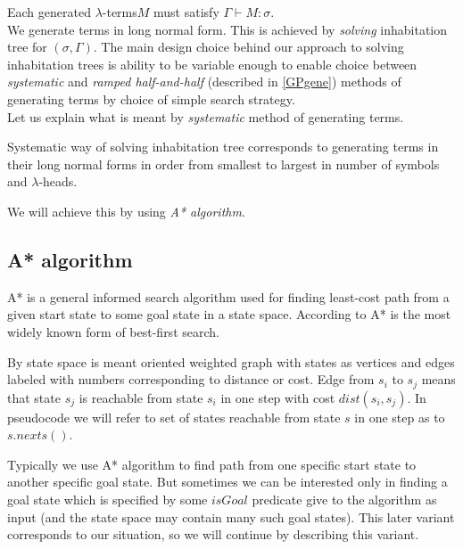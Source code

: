 \documentclass[12pt,a4paper]{report}
\newcommand{\Lets}{Let us\xspace}
\newcommand{\lterms}{$\lambda$-terms\xspace}
\newcommand{\lheads}{$\lambda$-heads\xspace}
\newcommand{\turst}[3]{$#1\vdash{}#2:#3$\xspace}
\newcommand{\GMS}{\turst{\Gamma}{M}{\sigma}}
\begin{document}
Each generated \lterms $M$ must  satisfy \GMS. \\

We generate terms in long normal form.
This is achieved by \textit{solving} inhabitation tree for $(\sigma,\Gamma)$.  
The main design choice behind our approach to solving inhabitation trees
is ability to be variable enough to enable choice between 
\textit{systematic}  
and \textit{ramped half-and-half} (described in \ref{GPgene}) 
methods of generating terms 
by choice of simple search strategy.\\

\Lets explain what is meant by \textit{systematic} 
method of generating terms. 

Systematic way of solving inhabitation tree corresponds to
generating terms in their long normal forms
in order from smallest to largest in number of symbols and \lheads.

We will achieve this by using \textit{A* algorithm}. 



\subsection{A* algorithm}

A* is a general informed search algorithm used for finding least-cost 
path from a given start state to some goal state in a state space.
According to \cite{AIAMA} A* is the most widely known form of best-first search.

By state space is meant oriented weighted graph with states as vertices and edges 
labeled with numbers corresponding to distance or cost. 
Edge from $s_i$ to $s_j$ means that state 
$s_j$ is reachable from state $s_i$ in one step with cost $dist(s_i,s_j)$.
In pseudocode we will refer to set of states reachable from 
state $s$ in one step as to $s.nexts()$.

Typically we use A* algorithm to find path from one specific start state to another 
specific goal state. But sometimes  
we can be interested only in finding a goal state which 
is specified by some $isGoal$ predicate give to the algorithm as
input (and the state space may contain many such goal states). 
This later variant corresponds to our situation, 
so we will continue by describing this variant.
\end{document}
